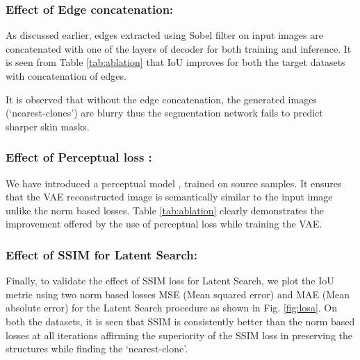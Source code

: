 \documentclass[runningheads]{llncs}
\begin{document}
\subsubsection{Effect of Edge concatenation:}
As discussed earlier, edges extracted using Sobel filter on input images are concatenated with one of the layers of decoder for both training and inference.  It is seen from Table \ref{tab:ablation} that IoU improves for both the target datasets with concatenation of edges.
\setlength{\tabcolsep}{12.4pt}
\begin{table}[h]
\caption{Ablation of different components of GLSS during training and inference; Edge, perceptual loss  and Latent Search (LS).}
\begin{center}
\end{center}
\label{tab:ablation}
\end{table} 
It is observed that without the edge concatenation, the generated images (`nearest-clones') are blurry thus the segmentation network fails to predict sharper skin masks.
\subsubsection{Effect of Perceptual loss :}
We have introduced a perceptual model , trained on source samples. It ensures that the VAE reconstructed image is semantically similar to the input image unlike the norm based losses. Table \ref{tab:ablation} clearly demonstrates the improvement offered by the use of perceptual loss while training the VAE.
\subsubsection{Effect of SSIM for Latent Search:}
Finally, to validate the effect of SSIM loss for Latent Search, we plot the IoU metric using two norm based losses MSE (Mean squared error) and MAE (Mean absolute error) for the Latent Search procedure as shown in Fig. \ref{fig:losa}. On both the datasets, it is seen  that SSIM is consistently better than the norm based losses at all iterations affirming the superiority of the SSIM loss in preserving the structures while finding the `nearest-clone'.  
\end{document}
